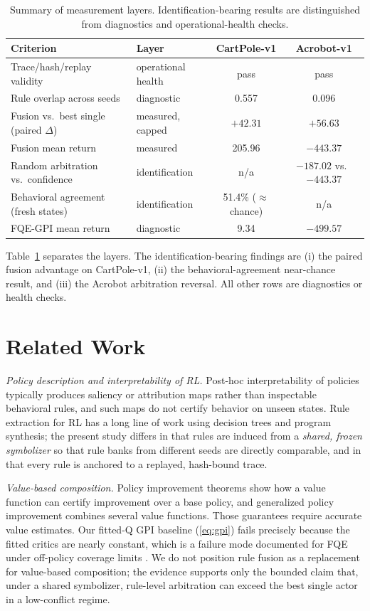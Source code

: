 \documentclass[11pt]{article}
\begin{document}
\begin{table}[t]
\centering
\caption{Summary of measurement layers. Identification-bearing results are distinguished from
diagnostics and operational-health checks.}
\label{tab:verdicts}
\begin{tabular}{llcc}
\toprule
Criterion & Layer & CartPole-v1 & Acrobot-v1 \\
\midrule
Trace/hash/replay validity & operational health & pass & pass \\
Rule overlap across seeds & diagnostic & 0.557 & 0.096 \\
Fusion vs.\ best single (paired $\Delta$) & measured, capped & $+42.31$ & $+56.63$ \\
Fusion mean return & measured & 205.96 & $-443.37$ \\
Random arbitration vs.\ confidence & identification & n/a & $-187.02$ vs.\ $-443.37$ \\
Behavioral agreement (fresh states) & identification & 51.4\% ($\approx$ chance) & n/a \\
FQE-GPI mean return & diagnostic & 9.34 & $-499.57$ \\
\bottomrule
\end{tabular}
\end{table}

Table~\ref{tab:verdicts} separates the layers. The identification-bearing findings are (i) the
paired fusion advantage on CartPole-v1, (ii) the behavioral-agreement near-chance result, and
(iii) the Acrobot arbitration reversal. All other rows are diagnostics or health checks.

\section{Related Work}
\label{sec:related}

\emph{Policy description and interpretability of RL.} Post-hoc interpretability of policies
typically produces saliency or attribution maps rather than inspectable behavioral rules, and such
maps do not certify behavior on unseen states. Rule extraction for RL has a long line of work using
decision trees and program synthesis; the present study differs in that rules are induced from a
\emph{shared, frozen symbolizer} so that rule banks from different seeds are directly comparable,
and in that every rule is anchored to a replayed, hash-bound trace.

\emph{Value-based composition.} Policy improvement theorems \cite{sutton2018reinforcement} show how
a value function can certify improvement over a base policy, and generalized policy improvement
combines several value functions. Those guarantees require accurate value estimates. Our fitted-Q
GPI baseline (\ref{eq:gpi}) fails precisely because the fitted critics are nearly constant, which
is a failure mode documented for FQE under off-policy coverage limits
\cite{le2019batch,voloshin2021empirical}. We do not position rule fusion as a replacement for
value-based composition; the evidence supports only the bounded claim that, under a shared
symbolizer, rule-level arbitration can exceed the best single actor in a low-conflict regime.
\end{document}
